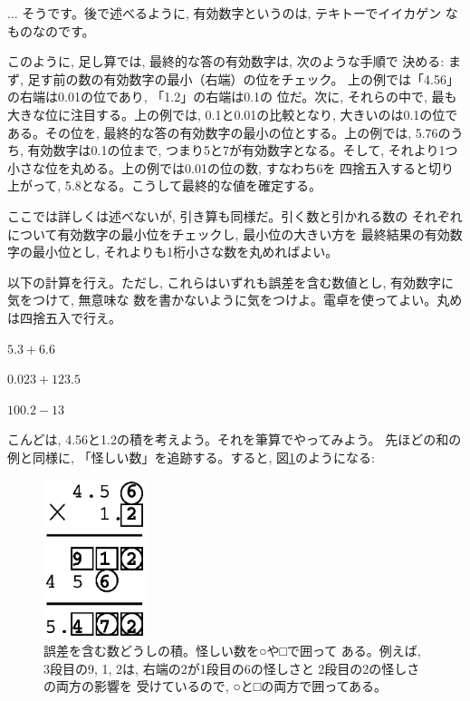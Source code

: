 \begin{faq}{\small{}
... そうです。後で述べるように, 有効数字というのは, テキトーでイイカゲン
なものなのです。}\end{faq}

このように, 足し算では, 最終的な答の有効数字は, 次のような手順で
決める: まず, 足す前の数の有効数字の最小（右端）の位をチェック。
上の例では「4.56」の右端は0.01の位であり, 「1.2」の右端は0.1の
位だ。次に, それらの中で, 最も大きな位に注目する。上の例では, 
0.1と0.01の比較となり, 大きいのは0.1の位である。その位を, 
最終的な答の有効数字の最小の位とする。上の例では, 5.76のうち, 
有効数字は0.1の位まで, つまり5と7が有効数字となる。そして, 
それより1つ小さな位を丸める。上の例では0.01の位の数, すなわち6を
四捨五入すると切り上がって, 5.8となる。こうして最終的な値を確定する。

ここでは詳しくは述べないが, 引き算も同様だ。引く数と引かれる数の
それぞれについて有効数字の最小位をチェックし, 最小位の大きい方を
最終結果の有効数字の最小位とし, それよりも1桁小さな数を丸めればよい。

\begin{q}\label{q:guard_digit_prac2} 以下の計算を行え。ただし, 
これらはいずれも誤差を含む数値とし, 有効数字に気をつけて, 無意味な
数を書かないように気をつけよ。電卓を使ってよい。丸めは四捨五入で行え。
\begin{edaenumerate}
\item $5.3 + 6.6$
\item $0.023 + 123.5$
\item $100.2 - 13$
\end{edaenumerate}
\end{q}

こんどは, 4.56と1.2の積を考えよう。それを筆算でやってみよう。
先ほどの和の例と同様に, 「怪しい数」を追跡する。すると, 
図\ref{fig:guard_digit_mult}のようになる:

\begin{figure}[h]
    \centering
    \includegraphics[width=3cm]{guard_digit_mult.eps}
    \caption{誤差を含む数どうしの積。怪しい数を○や□で囲って
ある。例えば, 3段目の9, 1, 2は, 右端の2が1段目の6の怪しさと
2段目の2の怪しさの両方の影響を
受けているので, ○と□の両方で囲ってある。}\label{fig:guard_digit_mult}
\end{figure}

